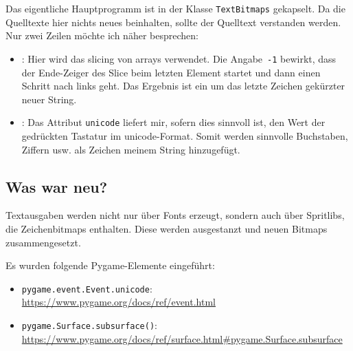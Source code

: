 Das eigentliche Hauptprogramm ist in der Klasse \texttt{TextBitmaps} gekapselt. Da die Quelltexte hier nichts neues beinhalten, sollte der Quelltext verstanden werden. Nur zwei Zeilen möchte ich näher besprechen:

\begin{itemize}
    \item {}: Hier wird das \gls{slicing} von \glspl{array} verwendet. Die Angabe~\texttt{-1} bewirkt, dass der Ende-Zeiger des Slice beim letzten Element startet und dann einen Schritt nach links geht. Das Ergebnis ist ein um das letzte Zeichen gekürzter neuer String.

    \item {}: Das Attribut \texttt{unicode} liefert mir, sofern dies sinnvoll ist, den Wert der gedrückten Tastatur im \gls{unicode}-Format. Somit werden sinnvolle Buchstaben, Ziffern usw. als Zeichen meinem String hinzugefügt.
\end{itemize}





\subsection*{Was war neu?}

Textausgaben werden nicht nur über Fonts erzeugt, sondern auch über Spritlibs, die Zeichenbitmaps enthalten. Diese werden ausgestanzt und neuen Bitmaps zusammengesetzt.

Es wurden folgende Pygame-Elemente eingeführt:

\begin{itemize}
	\item \texttt{pygame.event.Event.unicode}:
	\\ \url{https://www.pygame.org/docs/ref/event.html}

	\item \texttt{pygame.Surface.subsurface()}:
	\\ \url{https://www.pygame.org/docs/ref/surface.html#pygame.Surface.subsurface}
	
\end{itemize}
